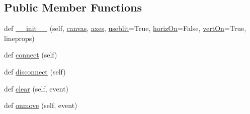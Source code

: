 \subsection*{Public Member Functions}
\begin{DoxyCompactItemize}
\item 
def \hyperlink{classmatplotlib_1_1widgets_1_1MultiCursor_a13b587cc88fd5939293b6172dc65edbd}{\+\_\+\+\_\+init\+\_\+\+\_\+} (self, \hyperlink{classmatplotlib_1_1widgets_1_1MultiCursor_a53b87f01c4591398f4f42e1e8852b6bd}{canvas}, \hyperlink{classmatplotlib_1_1widgets_1_1MultiCursor_a40f3498fea3710487d9f9c827052d48d}{axes}, \hyperlink{classmatplotlib_1_1widgets_1_1MultiCursor_a7c61d66b87dfc7f8bf44b272c7b2116d}{useblit}=True, \hyperlink{classmatplotlib_1_1widgets_1_1MultiCursor_a4169fa323f17c3b8ba0f887531633704}{horiz\+On}=False, \hyperlink{classmatplotlib_1_1widgets_1_1MultiCursor_a019f42179207723a771763a89ddcc6cb}{vert\+On}=True, lineprops)
\item 
def \hyperlink{classmatplotlib_1_1widgets_1_1MultiCursor_a6576a351e4c7faa5f7d4c117efa2f50c}{connect} (self)
\item 
def \hyperlink{classmatplotlib_1_1widgets_1_1MultiCursor_a3ca29a3a91fbbc5cd4d27f1a06070b23}{disconnect} (self)
\item 
def \hyperlink{classmatplotlib_1_1widgets_1_1MultiCursor_a08b59a7076a41a4f3d8e7105843dfd0b}{clear} (self, event)
\item 
def \hyperlink{classmatplotlib_1_1widgets_1_1MultiCursor_a8aa78dcdcce470694cba6ab8bcdfe006}{onmove} (self, event)
\end{DoxyCompactItemize}
